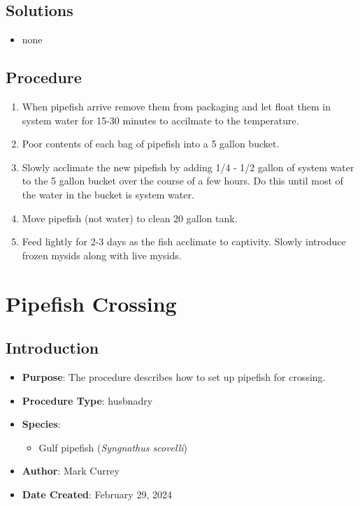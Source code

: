 \documentclass[
  letterpaper,
  DIV=11,
  numbers=noendperiod]{scrreprt}
\providecommand{\tightlist}{%
  \setlength{\itemsep}{0pt}\setlength{\parskip}{0pt}}\usepackage{longtable,booktabs,array}
\begin{document}
\hypertarget{solutions-27}{%
\section{Solutions}\label{solutions-27}}

\begin{itemize}
\tightlist
\item
  none
\end{itemize}

\hypertarget{procedure-32}{%
\section{Procedure}\label{procedure-32}}

\begin{enumerate}
\def\labelenumi{\arabic{enumi}.}
\tightlist
\item
  When pipefish arrive remove them from packaging and let float them in
  system water for 15-30 minutes to accilmate to the temperature.
\item
  Poor contents of each bag of pipefish into a 5 gallon bucket.
\item
  Slowly acclimate the new pipefish by adding 1/4 - 1/2 gallon of system
  water to the 5 gallon bucket over the course of a few hours. Do this
  until most of the water in the bucket is system water.
\item
  Move pipefish (not water) to clean 20 gallon tank.
\item
  Feed lightly for 2-3 days as the fish acclimate to captivity. Slowly
  introduce frozen mysids along with live mysids.
\end{enumerate}

\hypertarget{sec-husbandry_syng_cross}{%
\chapter{Pipefish Crossing}\label{sec-husbandry_syng_cross}}

\hypertarget{introduction-34}{%
\section{Introduction}\label{introduction-34}}

\begin{itemize}
\tightlist
\item
  \textbf{Purpose}: The procedure describes how to set up pipefish for
  crossing.
\item
  \textbf{Procedure Type}: husbnadry
\item
  \textbf{Species}:

  \begin{itemize}
  \tightlist
  \item
    Gulf pipefish (\emph{Syngnathus scovelli})
  \end{itemize}
\item
  \textbf{Author}: Mark Currey\\
\item
  \textbf{Date Created}: February 29, 2024
\end{itemize}
\end{document}
